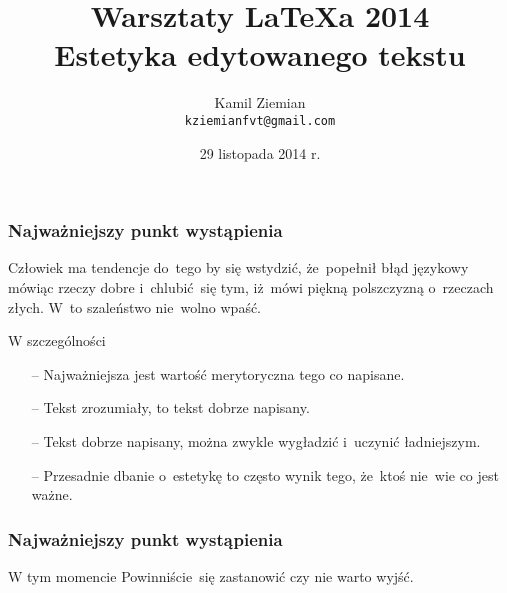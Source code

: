 \documentclass{beamer}  %
\title[Estetyka edytowanego tekstu]{Warsztaty \LaTeX a 2014 \\ Estetyka edytowanego tekstu}
\author{Kamil Ziemian \\
 \texttt{kziemianfvt@gmail.com}}
\date[29.11.2014]{29 listopada 2014 r.}
\begin{document}



\begin{frame}
  \titlepage %
\end{frame}






\begin{frame}
  \frametitle{Najważniejszy punkt wystąpienia}

  \begin{block}{}
    Człowiek ma tendencje do~tego by się wstydzić, że~popełnił błąd
    językowy mówiąc rzeczy dobre i~chlubić~się tym, iż~mówi piękną
    polszczyzną o~rzeczach złych. W~to szaleństwo nie~wolno wpaść.
  \end{block}

  \begin{block}{W szczególności}
    \begin{itemize}
    \item[--] Najważniejsza jest wartość merytoryczna tego co
      napisane.
    \item[--] Tekst zrozumiały, to tekst dobrze napisany.
    \item[--] Tekst dobrze napisany, można zwykle wygładzić i~uczynić
      ładniejszym.
    \item[--] Przesadnie dbanie o~estetykę to często wynik tego,
      że~ktoś nie~wie co jest ważne.
    \end{itemize}
  \end{block}

\end{frame}



\begin{frame}
  \frametitle{Najważniejszy punkt wystąpienia}

  \begin{block}{W tym momencie}
    Powinniście~się zastanowić czy nie warto wyjść.
  \end{block}

\end{frame}
\end{document}
